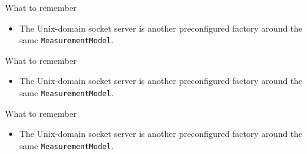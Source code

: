 \documentclass[
  a4paper,
  openany]{book}
\providecommand{\tightlist}{%
  \setlength{\itemsep}{0pt}\setlength{\parskip}{0pt}}
\providecommand{\passthrough}[1]{#1}
\begin{document}
\clearpage
{}
\begin{snodecrememberbox}{What to remember}\begin{itemize}\tightlist\item The Unix-domain socket server is another preconfigured factory around
  the same \passthrough{\lstinline!MeasurementModel!}.\par\end{itemize}\end{snodecrememberbox}
\clearpage
{}
\begin{snodecrememberbox}{What to remember}\begin{itemize}\tightlist\item The Unix-domain socket server is another preconfigured factory around
  the same \passthrough{\lstinline!MeasurementModel!}.\par\end{itemize}\end{snodecrememberbox}
\clearpage
{}
\begin{snodecrememberbox}{What to remember}\begin{itemize}\tightlist\item \begingroup\raggedright The Unix-domain socket server is another preconfigured factory around
  the same \passthrough{\lstinline!MeasurementModel!}.\par\endgroup\end{itemize}\end{snodecrememberbox}
\clearpage
\end{document}
